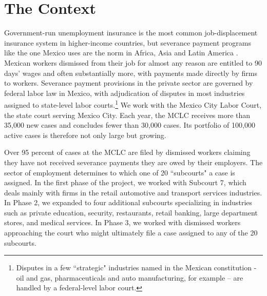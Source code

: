 \documentclass[11pt, a4paper]{article}
\begin{document}

\section{The Context}\label{ContextSection}

 Government-run unemployment insurance is the most common job-displacement insurance system in higher-income countries, but severance payment programs like the one Mexico uses are the norm in Africa, Asia and Latin America \citep{Gerard_NBER25749}. Mexican workers dismissed from their job for almost any reason are entitled to 90 days' wages and often substantially more, with payments made directly by firms to workers. Severance payment provisions in the private sector are governed by federal labor law in Mexico, with adjudication of disputes in most industries assigned to state-level labor courts.\footnote{Disputes in a few ``strategic" industries named in the Mexican constitution - oil and gas, pharmaceuticals and auto manufacturing, for example – are handled by a federal-level labor court.} We work with the Mexico City Labor Court, the state court serving Mexico City. Each year, the MCLC receives more than 35,000 new cases and concludes fewer than 30,000 cases. Its portfolio of 100,000 active cases is therefore not only large but growing.
 
Over 95 percent of cases at the MCLC are filed by dismissed workers claiming they have not received severance payments they are owed by their employers. The sector of employment determines to which one of 20 ``subcourts" a case is assigned. In the first phase of the project, we worked with Subcourt 7, which deals mainly with firms in the retail automotive and transport services industries. In Phase 2, we expanded to four additional subcourts specializing in industries such as private education, security, restaurants, retail banking, large department stores, and medical services. In Phase 3, we worked with dismissed workers approaching the court who might ultimately file a case assigned to any of the 20 subcourts. 
\end{document}
